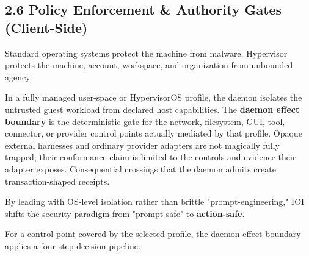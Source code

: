 \documentclass[
  11pt,
]{article}
\begin{document}
\hypertarget{policy-enforcement-authority-gates-client-side}{%
\subsection{2.6 Policy Enforcement \& Authority Gates
(Client-Side)}\label{policy-enforcement-authority-gates-client-side}}

Standard operating systems protect the machine from malware. Hypervisor
protects the machine, account, workspace, and organization from
unbounded agency.

In a fully managed user-space or HypervisorOS profile, the daemon isolates the
untrusted guest workload from declared host capabilities. The \textbf{daemon
effect boundary} is the deterministic gate for the network, filesystem, GUI,
tool, connector, or provider control points actually mediated by that profile.
Opaque external harnesses and ordinary provider adapters are not magically
fully trapped; their conformance claim is limited to the controls and evidence
their adapter exposes. Consequential crossings that the daemon admits create
transaction-shaped receipts.

By leading with OS-level isolation rather than brittle
"prompt-engineering," IOI shifts the security paradigm from
"prompt-safe" to \textbf{action-safe}.


\begin{center}
\end{center}


For a control point covered by the selected profile, the daemon effect boundary
applies a four-step decision pipeline:
\end{document}
